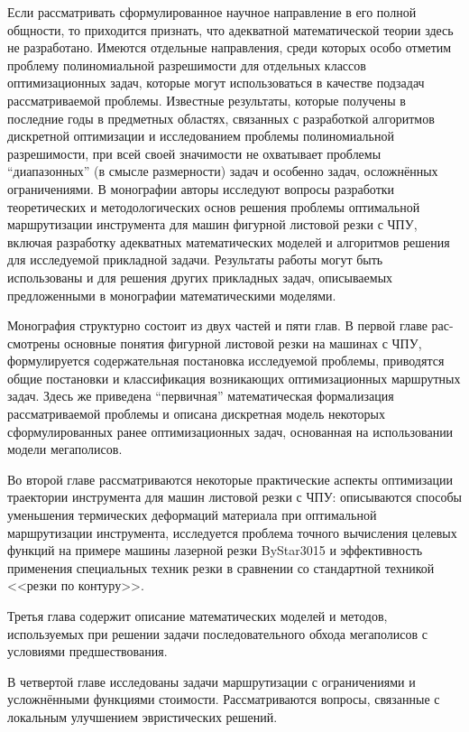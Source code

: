 \documentclass[11pt,twoside]{report}
\begin{document}
Если рассматривать сформулированное научное направление в его полной общности,
то приходится признать, что адекватной математической теории здесь не разработано.
Имеются отдельные направления, среди которых особо отметим проблему полиномиальной разрешимости
для отдельных классов оптимизационных задач,
которые могут использоваться в качестве подзадач рассматриваемой проблемы.
Известные результаты, которые получены в последние годы в предметных областях,
связанных с разработкой алгоритмов дискретной оптимизации
и исследованием проблемы полиномиальной разрешимости,
при всей своей значимости не охватывает проблемы “диапазонных”
(в смысле размерности) задач и особенно задач,
осложнённых ограничениями.
В монографии авторы исследуют вопросы разработки
теоретических и методологических основ решения проблемы
оптимальной маршрутизации инструмента для машин фигурной листовой резки с ЧПУ,
включая разработку адекватных математических моделей
и алгоритмов решения для исследуемой прикладной задачи.
Результаты работы могут быть использованы и для решения
других прикладных задач,
описываемых предложенными в монографии математическими моделями.

Монография структурно состоит из двух частей и пяти глав.
В первой главе рас-смотрены основные понятия
фигурной листовой резки на машинах с ЧПУ,
формулируется содержательная постановка исследуемой проблемы,
приводятся общие постановки и классификация
возникающих оптимизационных маршрутных задач.
Здесь же приведена “первичная” математическая формализация
рассматриваемой проблемы и описана дискретная модель
некоторых сформулированных ранее оптимизационных задач,
основанная на использовании модели мегаполисов.

Во второй главе рассматриваются некоторые
практические аспекты оптимизации траектории
инструмента для машин листовой резки с ЧПУ:
описываются способы уменьшения термических деформаций
материала при оптимальной маршрутизации инструмента,
исследуется проблема точного вычисления целевых функций
на примере машины лазерной резки ByStar3015
и эффективность применения специальных техник резки
в сравнении со стандартной техникой <<резки по контуру>>.

Третья глава содержит описание математических моделей и методов,
используемых при решении задачи последовательного обхода
мегаполисов с условиями предшествования.

В четвертой главе исследованы задачи маршрутизации
с ограничениями и усложнёнными функциями стоимости.
Рассматриваются вопросы, связанные с
локальным улучшением эвристических решений.
\end{document}
